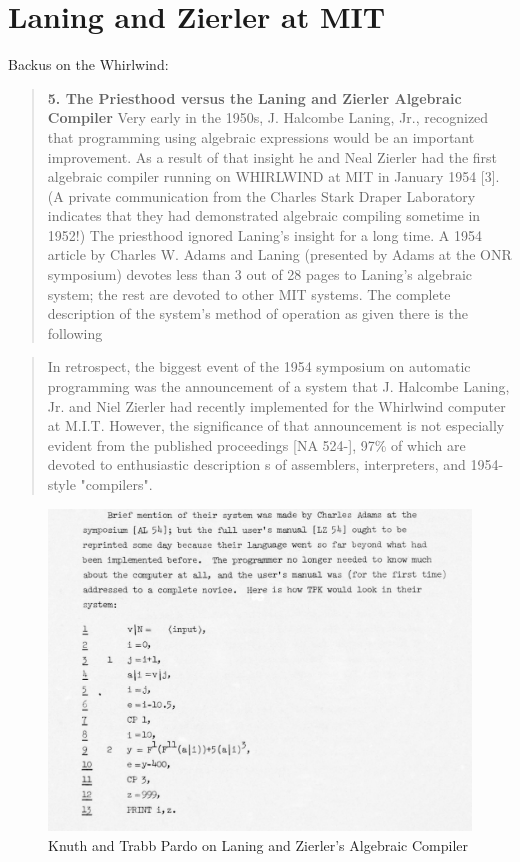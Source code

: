 \section{Laning and Zierler at MIT}
\label{sec:laning-zierler}


Backus on the Whirlwind\cite{Backus_1980_Programming_in_America_in_1950s}:
\begin{quotation}
  \textbf{5. The Priesthood versus the Laning and Zierler Algebraic Compiler}
  Very early in the 1950s, J. Halcombe Laning, Jr., recognized that
  programming using algebraic expressions would be an important improvement.
  As a result of that insight he and Neal Zierler had the first
  algebraic compiler
  running on WHIRLWIND at MIT in January 1954 [3]. (A private
    communication from the Charles Stark Draper Laboratory indicates
    that they had
  demonstrated algebraic compiling sometime in 1952!) The priesthood
  ignored Laning's insight for a long time. A 1954 article by Charles W. Adams
  and Laning (presented by Adams at the ONR symposium) devotes less than
  3 out of 28 pages to Laning's algebraic system; the rest are devoted to other
  MIT systems. The complete description of the system's method of operation
  as given there is the following
\end{quotation}

\begin{quotation}
  In retrospect, the biggest event of the 1954 symposium on automatic
  programming
  was the announcement of a system that J. Halcombe Laning, Jr. and Niel Zierler
  had recently implemented for the Whirlwind computer at M.I.T.  However, the
  significance of that announcement is not especially evident from the published
  proceedings [NA 524-], 97\% of which are devoted to enthusiastic description s
  of assemblers, interpreters, and 1954-style "compilers".
  \cite{Knuth_TrabbPardo_1976_Early_Development}
\end{quotation}

\begin{figure}[h!]
  \centering
  \includegraphics[width=0.5\linewidth]{resource/knuth_pardo_on_laning_zierlers_algebraic_compiler.png}
  \caption{Knuth and Trabb Pardo on Laning and Zierler's Algebraic Compiler}
  \label{fig:knuth-pardo-on-laning-zierler}
\end{figure}

